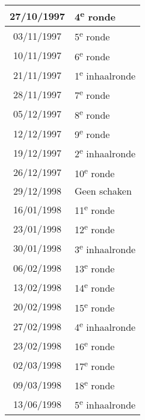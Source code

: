 \documentclass[a4paper]{scrreprt}
\begin{document}
\begin{landscape}
\begin{center}
\begin{tabular}{ c l }
    \hline
\rowcolor{headingkleur!25}
    27/10/1997 & 4\textsuperscript{e} ronde \\
    \hline
\rowcolor{headingkleur!25}
    03/11/1997 & 5\textsuperscript{e} ronde \\
    \hline
\rowcolor{headingkleur!25}
    10/11/1997 & 6\textsuperscript{e} ronde \\
    \hline
\rowcolor{headingkleur!10}
    21/11/1997 & 1\textsuperscript{e} inhaalronde \\
    \hline
\rowcolor{headingkleur!25}
    28/11/1997 & 7\textsuperscript{e} ronde \\
    \hline
\rowcolor{headingkleur!25}
    05/12/1997 & 8\textsuperscript{e} ronde \\
    \hline
\rowcolor{headingkleur!25}
    12/12/1997 & 9\textsuperscript{e} ronde \\
    \hline
\rowcolor{headingkleur!10}
    19/12/1997 & 2\textsuperscript{e} inhaalronde \\
    \hline
\rowcolor{headingkleur!25}
    26/12/1997 & 10\textsuperscript{e} ronde \\
    \hline
    29/12/1998 & Geen schaken \\
    \hline
\rowcolor{headingkleur!25}
    16/01/1998 & 11\textsuperscript{e} ronde \\
    \hline
\rowcolor{headingkleur!25}
    23/01/1998 & 12\textsuperscript{e} ronde \\
    \hline
\rowcolor{headingkleur!10}
    30/01/1998 & 3\textsuperscript{e} inhaalronde \\
    \hline
\rowcolor{headingkleur!25}
    06/02/1998 & 13\textsuperscript{e} ronde \\
    \hline
\rowcolor{headingkleur!25}
    13/02/1998 & 14\textsuperscript{e} ronde \\
    \hline
\rowcolor{headingkleur!25}
    20/02/1998 & 15\textsuperscript{e} ronde \\
    \hline
\rowcolor{headingkleur!10}
    27/02/1998 & 4\textsuperscript{e} inhaalronde \\
    \hline
\rowcolor{headingkleur!25}
    23/02/1998 & 16\textsuperscript{e} ronde \\
    \hline
\rowcolor{headingkleur!25}
    02/03/1998 & 17\textsuperscript{e} ronde \\
    \hline
\rowcolor{headingkleur!25}
    09/03/1998 & 18\textsuperscript{e} ronde \\
    \hline
\rowcolor{headingkleur!10}
    13/06/1998 & 5\textsuperscript{e} inhaalronde \\
    \hline
   \end{tabular}
  \end{center}
 \end{landscape}
\end{document}
